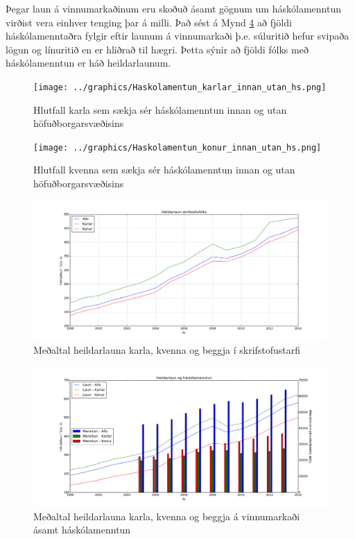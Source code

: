 \documentclass[12pt, git, draft]{rureport}
\begin{document}
Þegar laun á vinnumarkaðinum eru skoðuð ásamt gögnum um háskólamenntun virðist vera einhver tenging þar á milli. Það sést á Mynd \ref{fig:heildarhask} að fjöldi háskólamenntaðra fylgir eftir launum á vinnumarkaði þ.e. súluritið hefur svipaða lögun og línuritið en er hliðrað til hægri. Þetta sýnir að fjöldi fólks með háskólamenntun er háð heildarlaunum.

\pagebreak

\begin{figure}
	\centering 
	\texttt{[image: ../graphics/Haskolamentun\_karlar\_innan\_utan\_hs.png]}
	\caption{Hlutfall karla sem sækja sér háskólamenntun innan og utan höfuðborgarsvæðisins \label{fig:menntukarla}}
\end{figure}

\begin{figure}
	\centering 
	\texttt{[image: ../graphics/Haskolamentun\_konur\_innan\_utan\_hs.png]}
	\caption{Hlutfall kvenna sem sækja sér háskólamenntun innan og utan höfuðborgarsvæðisins\label{fig:menntunkonur}}
\end{figure}

\begin{figure}
	\centering 
	\includegraphics[width=\textwidth]{graphics/heildar_laun.png}
	\caption{Meðaltal heildarlauna karla, kvenna og beggja í skrifstofustarfi \label{fig:heildarlaun}}
\end{figure}

\begin{figure}
	\centering 
	\includegraphics[width=\textwidth]{graphics/heildar_laun_og_haskolamentun.png}
	\caption{Meðaltal heildarlauna karla, kvenna og beggja á vinnumarkaði ásamt háskólamenntun \label{fig:heildarhask}}
\end{figure}
\end{document}
